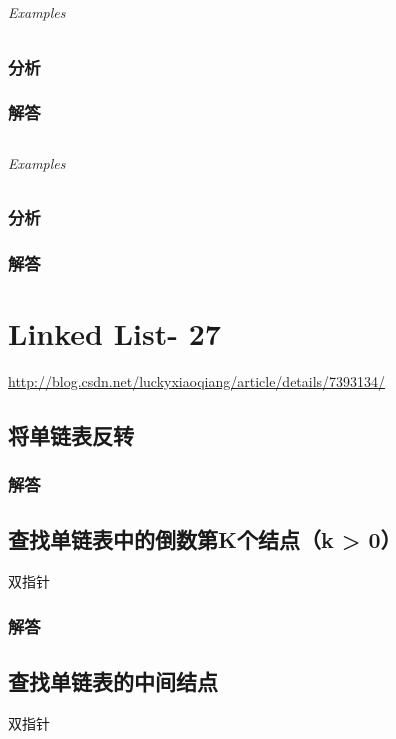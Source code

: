 \documentclass[UTF8,a4paper,12pt]{ctexbook}
\begin{document}
	
\section{}
	
	\subparagraph{Examples}
	
	\subsection{分析}
	
	\subsection{解答}
	
	
\section{}
	
	\subparagraph{Examples}
	
	\subsection{分析}
	
	\subsection{解答}
\chapter{Linked List- 27}
	\url{http://blog.csdn.net/luckyxiaoqiang/article/details/7393134/}
\section{将单链表反转}
	
	\subsection{解答}
	
	
\section{查找单链表中的倒数第K个结点（k > 0）}
		双指针
	\subsection{解答}
	
	
\section{查找单链表的中间结点}
		双指针
\end{document}
